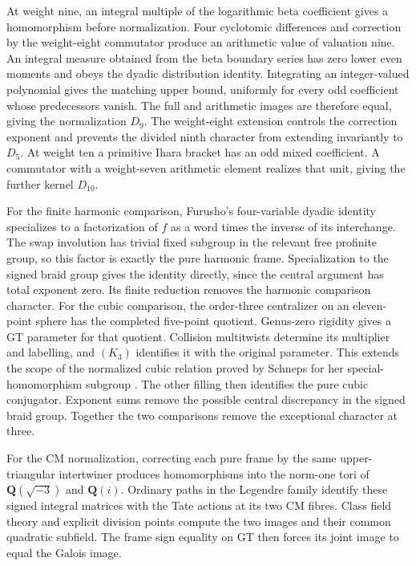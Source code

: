 \documentclass[11pt,a4paper]{article}
\theoremstyle{definition}
\theoremstyle{remark}
\newcommand{\Q}{\mathbf Q}
\begin{document}
At weight nine, an integral multiple of the logarithmic beta coefficient
gives a homomorphism before normalization. Four cyclotomic differences
and correction by the weight-eight commutator produce an arithmetic
value of valuation nine. An integral measure obtained from the beta
boundary series has zero lower even moments and obeys the dyadic
distribution identity. Integrating an integer-valued polynomial gives
the matching upper bound, uniformly for every odd coefficient whose
predecessors vanish. The full and arithmetic
images are therefore equal, giving the normalization $D_9$. The
weight-eight extension controls the correction exponent and prevents
the divided ninth character from extending invariantly to $D_5$.
At weight ten a primitive Ihara bracket has an odd mixed coefficient.
A commutator with a weight-seven arithmetic element realizes that
unit, giving the further kernel $D_{10}$.

For the finite harmonic comparison, Furusho's four-variable
dyadic identity specializes to a factorization of $f$ as a word
times the inverse of its interchange. The swap involution has
trivial fixed subgroup in the relevant free profinite group, so
this factor is exactly the pure harmonic frame. Specialization
to the signed braid group gives the identity directly, since the
central argument has total exponent zero. Its finite reduction removes the harmonic comparison
character. For the cubic comparison, the order-three centralizer
on an eleven-point sphere has the completed five-point quotient.
Genus-zero rigidity gives a GT parameter for that quotient.
Collision multitwists determine its multiplier and labelling, and
$(K_3)$ identifies it with the original parameter.
This extends the scope of the normalized cubic relation proved by
Schneps for her special-homomorphism subgroup
\cite[Theorem~3.4 and equation~(3.10), p.~667]{Schneps2006Special}. The other
filling then identifies the pure cubic conjugator. Exponent sums
remove the possible central discrepancy in the signed braid group.
Together the two comparisons remove the exceptional character at three.

For the CM normalization, correcting each pure frame by the same
upper-triangular intertwiner produces homomorphisms into the norm-one
tori of $\Q(\sqrt{-3})$ and $\Q(i)$.  Ordinary paths in the Legendre
family identify these signed integral matrices with the Tate actions
at its two CM fibres.  Class field theory and explicit division points
compute the two images and their common quadratic subfield.  The frame
sign equality on GT then forces its joint image to equal the Galois image.
\end{document}
